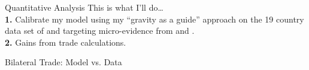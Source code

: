 \documentclass[9pt,pdftex,aspectratio=1610]{beamer}
\theoremstyle{definition}
\begin{document}

\begin{frame}[t]{Quantitative Analysis}
\smallskip
\smallskip
This is what I'll do\ldots\\
\bigskip
\textbf{1.} Calibrate my model using my ``gravity as a guide'' approach on the 19 country data set of \citet{eaton2002technology} and targeting micro-evidence from \citet{borusyak2021distributional} and \citet{auer2022unequal}. \\
\bigskip
\textbf{2.} Gains from trade calculations.\\
\end{frame}



\begin{frame}[t]{Bilateral Trade: Model vs. Data}
\begin{figure}[!t]
\hspace{-.5cm}
\end{figure}
\end{frame}

\end{document}
